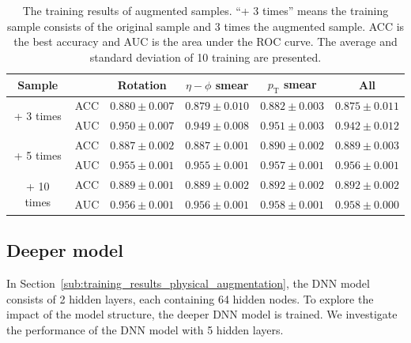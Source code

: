 \documentclass[12pt]{article}
\begin{document}
		\begin{table}[htpb]
			\centering
			\caption{The training results of augmented samples. ``+ 3 times'' means the training sample consists of the original sample and 3 times the augmented sample. ACC is the best accuracy and AUC is the area under the ROC curve. The average and standard deviation of 10 training are presented.}
			\label{tab:augmentation_sample_training_results}
			\begin{tabular}{c|c|cccc}
				Sample                      &     & Rotation          & $\eta-\phi$ smear & $p_{\text{T}}$ smear & All               \\ \hline
				\multirow{2}{*}{+ 3 times}  & ACC & $0.880 \pm 0.007$ & $0.879 \pm 0.010$ & $0.882 \pm 0.003$    & $0.875 \pm 0.011$ \\
											& AUC & $0.950 \pm 0.007$ & $0.949 \pm 0.008$ & $0.951 \pm 0.003$    & $0.942 \pm 0.012$ \\ \hline
				\multirow{2}{*}{+ 5 times}  & ACC & $0.887 \pm 0.002$ & $0.887 \pm 0.001$ & $0.890 \pm 0.002$    & $0.889 \pm 0.003$ \\
											& AUC & $0.955 \pm 0.001$ & $0.955 \pm 0.001$ & $0.957 \pm 0.001$    & $0.956 \pm 0.001$ \\ \hline
				\multirow{2}{*}{+ 10 times} & ACC & $0.889 \pm 0.001$ & $0.889 \pm 0.002$ & $0.892 \pm 0.002$    & $0.892 \pm 0.002$ \\
											& AUC & $0.956 \pm 0.001$ & $0.956 \pm 0.001$ & $0.958 \pm 0.001$    & $0.958 \pm 0.000$
			\end{tabular}
		\end{table}	
		
		

	\subsection{Deeper model}%
	\label{sub:deeper_model}
		In Section~\ref{sub:training_results_physical_augmentation}, the DNN model consists of 2 hidden layers, each containing 64 hidden nodes. To explore the impact of the model structure, the deeper DNN model is trained. We investigate the performance of the DNN model with 5 hidden layers.
\end{document}
